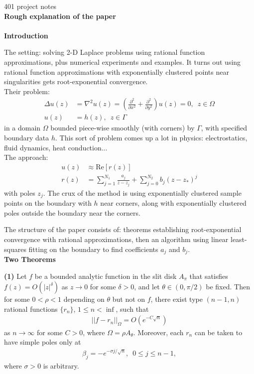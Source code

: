 \documentclass[12]{article}
\begin{document}
401 project notes\\
\large
\textbf{Rough explanation of the paper}\\ \\ \normalsize
\textbf{Introduction}

	The setting: solving 2-D Laplace problems using rational function approximations, plus numerical experiments and examples.
	It turns out using rational function approximations with exponentially clustered points near singularities gets root-exponential convergence.
	\\
	Their problem:
	\begin{align*}
	\Delta u(z) &= \nabla^2 u(z) = \left( \frac{\partial^2}{\partial x^2} + \frac{\partial^2}{\partial y^2}\right)u(z) = 0,\enspace z\in \Omega \\ 		u(z)&=h(z),\enspace z\in \Gamma
	\end{align*}
in a domain $\Omega$ bounded piece-wise smoothly (with corners) by $\Gamma$, with specified boundary data $h$. This sort of problem comes up a lot in physics: electrostatics, fluid dynamics, heat conduction...
	\\
	The approach:
	\begin{align*}
	u(z)&\approx \mathrm{Re}[r(z)] \\
	r(z) &= \sum_{j=1}^{N_1} \frac{a_j}{z-z_j} + \sum_{j=0}^{N_2} b_j (z-z_*)^j
	\end{align*}
with poles ${z_j}$. The crux of the method is using exponentially clustered sample points on the boundary with $h$ near corners, along with exponentially clustered poles outside the boundary near the corners.
	
	The structure of the paper consists of: theorems establishing root-exponential convergence with rational approximations, then an algorithm using linear least-squares fitting on the boundary to find coefficients $a_j$ and $b_j$. \\ 
	
\noindent
\textbf{Two Theorems}

	\textbf{(1)} Let $f$ be a bounded analytic function in the slit disk $A_\pi$ that satisfies $f(z)=O(|z|^\delta)$ as $z \to 0$ for some $\delta > 0$, and let $\theta \in (0,\pi /2)$ be fixed. Then for some $0< \rho < 1$ depending on $\theta$ but not on $f$, there exist type $(n-1,n)$ rational functions $\{r_n\}$, $1 \leq n < \inf$, such that
	\begin{align*}
	||f-r_n||_\Omega = O(e^{-C \sqrt{n}})
	\end{align*}
as $n \to \infty $ for some $C>0$, where $\Omega = \rho A_\theta$. Moreover, each $r_n$ can be taken to have simple poles only at
	\begin{align*}
	\beta_j = -e^{-\sigma j/\sqrt{n}}, \enspace 0\leq j \leq n-1,
	\end{align*}
where $\sigma >0$ is arbitrary.
	
\end{document}
